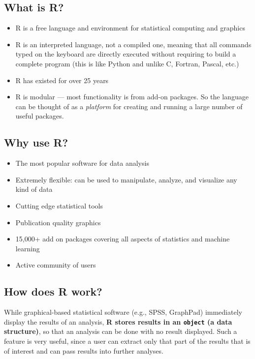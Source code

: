 \documentclass[]{book}
\providecommand{\tightlist}{%
  \setlength{\itemsep}{0pt}\setlength{\parskip}{0pt}}
\begin{document}
\subsection{What is R?}\label{what-is-r}

\begin{itemize}
\tightlist
\item
  R is a free language and environment for statistical computing and
  graphics
\item
  R is an interpreted language, not a compiled one, meaning that all
  commands typed on the keyboard are directly executed without requiring
  to build a complete program (this is like Python and unlike C,
  Fortran, Pascal, etc.)
\item
  R has existed for over 25 years
\item
  R is modular --- most functionality is from add-on packages. So the
  language can be thought of as a \emph{platform} for creating and
  running a large number of useful packages.
\end{itemize}

\subsection{Why use R?}\label{why-use-r}

\begin{itemize}
\tightlist
\item
  The most popular software for data analysis
\item
  Extremely flexible: can be used to manipulate, analyze, and visualize
  any kind of data
\item
  Cutting edge statistical tools
\item
  Publication quality graphics
\item
  15,000+ add on packages covering all aspects of statistics and machine
  learning
\item
  Active community of users
\end{itemize}

\subsection{How does R work?}\label{how-does-r-work}

While graphical-based statistical software (e.g., SPSS, GraphPad)
immediately display the results of an analysis, \textbf{R stores results
in an \texttt{object} (a data structure)}, so that an analysis can be
done with no result displayed. Such a feature is very useful, since a
user can extract only that part of the results that is of interest and
can pass results into further analyses.
\end{document}

